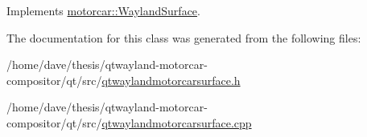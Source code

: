Implements \hyperlink{classmotorcar_1_1WaylandSurface_af2f54076ec690f4d478771183c9b0db5}{motorcar\-::\-Wayland\-Surface}.



The documentation for this class was generated from the following files\-:\begin{DoxyCompactItemize}
\item 
/home/dave/thesis/qtwayland-\/motorcar-\/compositor/qt/src/\hyperlink{qtwaylandmotorcarsurface_8h}{qtwaylandmotorcarsurface.\-h}\item 
/home/dave/thesis/qtwayland-\/motorcar-\/compositor/qt/src/\hyperlink{qtwaylandmotorcarsurface_8cpp}{qtwaylandmotorcarsurface.\-cpp}\end{DoxyCompactItemize}
